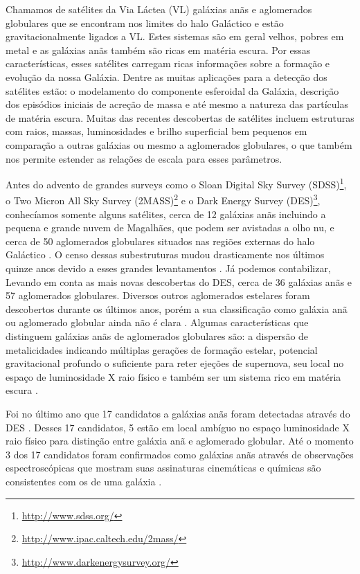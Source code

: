 \documentclass[
	12pt,				%
	openany,			%
	oneside,			%
	a4paper,			%
	english,			%
	brazil				%
	]{abntex2}
\begin{document}
\qquad Chamamos de  satélites da Via Láctea (VL) galáxias anãs e aglomerados globulares que se encontram nos limites do halo Galáctico e estão gravitacionalmente ligados a VL. Estes sistemas são em geral velhos, pobres em metal e as galáxias anãs também são ricas em matéria escura. Por essas características, esses satélites carregam ricas informações sobre a formação e evolução da nossa Galáxia. Dentre as muitas aplicações para a detecção dos satélites estão: o modelamento do componente esferoidal da Galáxia, descrição dos episódios iniciais de acreção de massa e até mesmo a natureza das partículas de matéria escura. Muitas das recentes descobertas de satélites incluem estruturas com raios, massas, luminosidades e brilho superficial bem pequenos em comparação a outras galáxias ou mesmo a aglomerados globulares, o que também nos permite estender as relações de escala para esses parâmetros. \par
\qquad Antes do advento de grandes surveys como o Sloan Digital Sky Survey (SDSS)\footnote{\url{http://www.sdss.org/}}, o Two Micron All Sky Survey (2MASS)\footnote{\url{http://www.ipac.caltech.edu/2mass/}} e o Dark Energy Survey (DES)\footnote{\url{http://www.darkenergysurvey.org/}},  conhecíamos somente alguns satélites, cerca de 12 galáxias anãs \cite{2012AJ....144....4M} incluindo a pequena e grande nuvem de Magalhães, que podem ser avistadas a olho nu, e cerca de 50 aglomerados globulares situados nas regiões externas do halo Galáctico \cite{1996AJ....112.1487H}. O censo dessas subestruturas mudou drasticamente nos últimos quinze anos devido a esses grandes levantamentos \cite{2005astro.ph..6460W,2006AAS...20917805Z,2010ApJ...712L.103B,2007MNRAS.382..515V} . Já podemos contabilizar, Levando em conta as mais novas descobertas do DES, cerca de 36 galáxias anãs e 57 aglomerados globulares. Diversos outros aglomerados estelares foram descobertos durante os últimos anos, porém a sua classificação como galáxia anã ou aglomerado globular ainda não é clara \cite{2010ApJ...712L.103B,2013ApJ...767..101B,2005AJ....129.2692W,2015ApJ...804L..44K,2015ApJ...803...63K}.  Algumas características que distinguem  galáxias anãs de aglomerados globulares são:  a dispersão de metalicidades indicando múltiplas gerações de formação estelar, potencial gravitacional profundo o suficiente para reter ejeções de supernova, seu local no espaço de luminosidade X raio físico e também ser um sistema rico em matéria escura \cite{2012AJ....144...76W}. \par
Foi no último ano que 17 candidatos a galáxias anãs foram detectadas através do DES \cite{2015ApJ...807...50B,2015arXiv150803622T}. Desses 17 candidatos, 5 estão em local ambíguo  no espaço luminosidade X raio físico para distinção entre galáxia anã e aglomerado globular. Até o momento 3 dos 17 candidatos foram confirmados como galáxias anãs  através de observações espectroscópicas que mostram suas assinaturas cinemáticas e químicas são consistentes com os de uma galáxia \cite{2015ApJ...811...62K,2015ApJ...810...56K}.  
\end{document}
